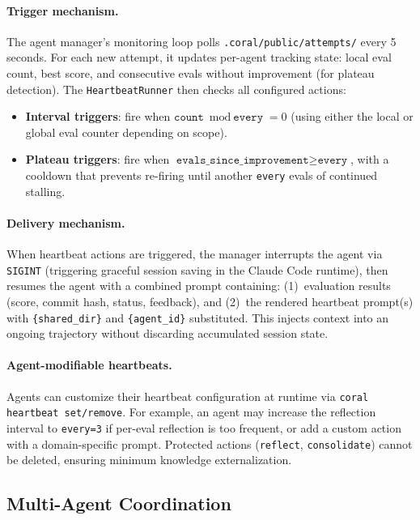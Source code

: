 \paragraph{Trigger mechanism.} The agent manager's monitoring loop polls \texttt{.coral/public/attempts/} every 5 seconds. For each new attempt, it updates per-agent tracking state: local eval count, best score, and consecutive evals without improvement (for plateau detection). The \texttt{HeartbeatRunner} then checks all configured actions:
\begin{itemize}[nosep,leftmargin=*]
    \item \textbf{Interval triggers}: fire when $\texttt{count} \bmod \texttt{every} = 0$ (using either the local or global eval counter depending on scope).
    \item \textbf{Plateau triggers}: fire when $\texttt{evals\_since\_improvement} \geq \texttt{every}$, with a cooldown that prevents re-firing until another \texttt{every} evals of continued stalling.
\end{itemize}

\paragraph{Delivery mechanism.} When heartbeat actions are triggered, the manager interrupts the agent via \texttt{SIGINT} (triggering graceful session saving in the Claude Code runtime), then resumes the agent with a combined prompt containing: (1)~evaluation results (score, commit hash, status, feedback), and (2)~the rendered heartbeat prompt(s) with \texttt{\{shared\_dir\}} and \texttt{\{agent\_id\}} substituted. This injects context into an ongoing trajectory without discarding accumulated session state.

\paragraph{Agent-modifiable heartbeats.} Agents can customize their heartbeat configuration at runtime via \texttt{coral heartbeat set/remove}. For example, an agent may increase the reflection interval to \texttt{every=3} if per-eval reflection is too frequent, or add a custom action with a domain-specific prompt. Protected actions (\texttt{reflect}, \texttt{consolidate}) cannot be deleted, ensuring minimum knowledge externalization.

\subsection{Multi-Agent Coordination}
\label{app:multi_agent}


